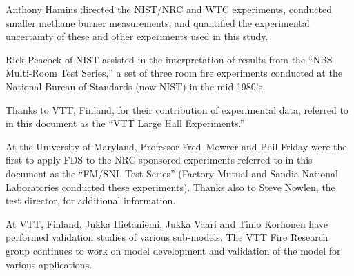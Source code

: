 \documentclass[11pt]{book}
\begin{document}
Anthony Hamins directed the NIST/NRC and WTC experiments, conducted smaller methane burner
measurements, and quantified the experimental uncertainty of these and other
experiments used in this study.

Rick Peacock of NIST assisted in the interpretation of results from
the ``NBS Multi-Room Test Series,'' a set of three room
fire experiments conducted at the National Bureau of Standards (now
NIST) in the mid-1980's.

Thanks to VTT, Finland, for their contribution of experimental data,
referred to in this document as the ``VTT Large Hall Experiments.''

At the University of Maryland, Professor Fred~Mowrer and Phil Friday
were the first to apply FDS to the NRC-sponsored experiments referred
to in this document as the ``FM/SNL Test Series'' (Factory Mutual and
Sandia National Laboratories conducted these experiments). Thanks also to
Steve Nowlen, the test director, for additional information.

At VTT, Finland, Jukka Hietaniemi, Jukka Vaari and Timo Korhonen have
performed validation studies of various sub-models. The VTT Fire
Research group continues to work on model development and
validation of the model for various applications.



\tableofcontents
\listoffigures
\listoftables

\mainmatter







%








\end{document}
